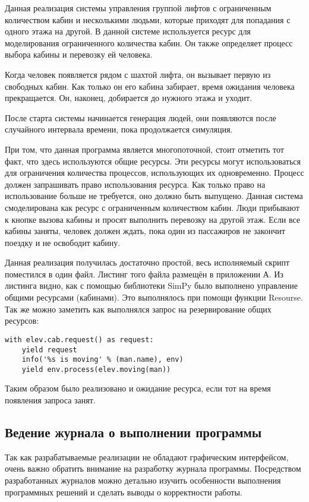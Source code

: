		Данная реализация системы управления группой лифтов с ограниченным количеством кабин и несколькими людьми,
			которые приходят для попадания с одного этажа на другой.
			В данной системе используется ресурс для моделирования ограниченного количества кабин.
			Он также определяет процесс выбора кабины и перевозку ей человека.

		Когда человек появляется рядом с шахтой лифта, он вызывает первую из свободных кабин.
			Как только он его кабина забирает, время ожидания человека прекращается.
			Он, наконец, добирается до нужного этажа и уходит.

		После старта системы начинается генерация людей, они появляются после случайного интервала времени,
		пока продолжается симуляция.


		При том, что данная программа является многопоточной, стоит отметить тот факт, что здесь используются общие ресурсы.
			Эти ресурсы могут использоваться для ограничения количества процессов, использующих их одновременно.
			Процесс должен запрашивать право использования ресурса. Как только право на использование больше не требуется,
			оно должно быть выпущено. Данная система смоделирована как ресурс с ограниченным количеством кабин.
			Люди прибывают к кнопке вызова кабины и просят выполнить перевозку на другой этаж.
			Если все кабины заняты, человек должен ждать, пока один из пассажиров не закончит поездку и не освободит кабину.

		Данная реализация получилась достаточно простой, весь исполняемый скрипт поместился в один файл.
			Листинг того файла размещён в приложении А. Из листинга видно, как с помощью библиотеки SimPy
			было выполнено управление общими ресурсами (кабинами). Это выполнялось при помощи функции Resourse.
			Так же можно заметить как выполнялся запрос на резервирование общих ресурсов:
\begin{lstlisting}
with elev.cab.request() as request:
	yield request
	info('%s is moving' % (man.name), env)
	yield env.process(elev.moving(man))
\end{lstlisting}

		Таким образом было реализовано и ожидание ресурса, если тот на время появления запроса занят.

	\subsection{Ведение журнала о выполнении программы}
		Так как разрабатываемые реализации не обладают графическим интерфейсом, очень важно обратить внимание
			на разработку журнала программы. Посредством разработанных журналов можно детально изучить
			особенности выполнения программных решений и сделать выводы о корректности работы.

